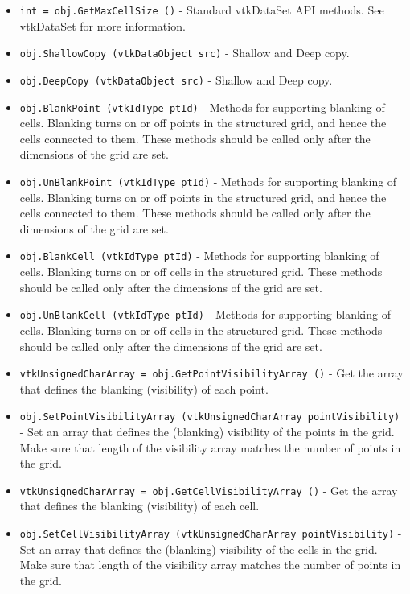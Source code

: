 \begin{itemize}
\item  \verb|int = obj.GetMaxCellSize ()| -  Standard vtkDataSet API methods. See vtkDataSet for more information.

\item  \verb|obj.ShallowCopy (vtkDataObject src)| -  Shallow and Deep copy.

\item  \verb|obj.DeepCopy (vtkDataObject src)| -  Shallow and Deep copy.

\item  \verb|obj.BlankPoint (vtkIdType ptId)| -  Methods for supporting blanking of cells. Blanking turns on or off
 points in the structured grid, and hence the cells connected to them.
 These methods should be called only after the dimensions of the
 grid are set.

\item  \verb|obj.UnBlankPoint (vtkIdType ptId)| -  Methods for supporting blanking of cells. Blanking turns on or off
 points in the structured grid, and hence the cells connected to them.
 These methods should be called only after the dimensions of the
 grid are set.

\item  \verb|obj.BlankCell (vtkIdType ptId)| -  Methods for supporting blanking of cells. Blanking turns on or off
 cells in the structured grid.
 These methods should be called only after the dimensions of the
 grid are set.

\item  \verb|obj.UnBlankCell (vtkIdType ptId)| -  Methods for supporting blanking of cells. Blanking turns on or off
 cells in the structured grid.
 These methods should be called only after the dimensions of the
 grid are set.

\item  \verb|vtkUnsignedCharArray = obj.GetPointVisibilityArray ()| -  Get the array that defines the blanking (visibility) of each point.

\item  \verb|obj.SetPointVisibilityArray (vtkUnsignedCharArray pointVisibility)| -  Set an array that defines the (blanking) visibility of the points
 in the grid. Make sure that length of the visibility array matches
 the number of points in the grid.

\item  \verb|vtkUnsignedCharArray = obj.GetCellVisibilityArray ()| -  Get the array that defines the blanking (visibility) of each cell.

\item  \verb|obj.SetCellVisibilityArray (vtkUnsignedCharArray pointVisibility)| -  Set an array that defines the (blanking) visibility of the cells
 in the grid. Make sure that length of the visibility array matches
 the number of points in the grid.


\end{itemize}
